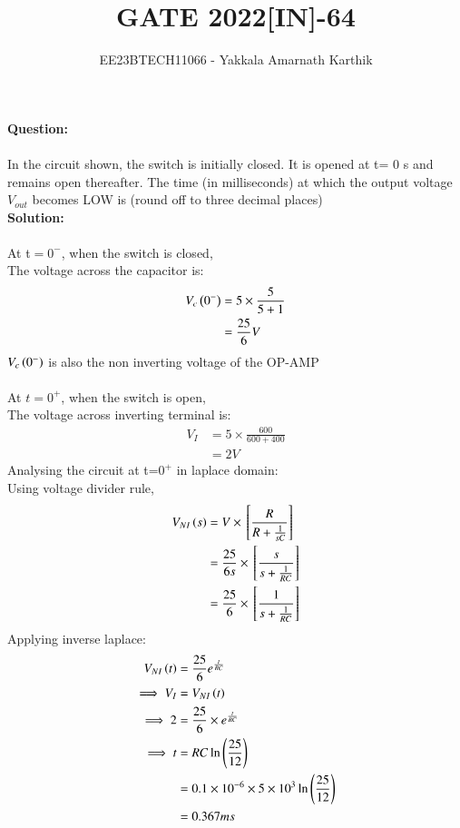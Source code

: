 \documentclass[journal,12pt,twocolumn]{IEEEtran}
\begin{document}


\title{GATE 2022[IN]-64}
\author{EE23BTECH11066 - Yakkala Amarnath Karthik}
\maketitle


\textbf{Question:}\\ \\
In the circuit shown, the switch is initially closed. It is opened at t= 0 s and
remains open thereafter. The time (in milliseconds) at which the output voltage
$V_{out}$ becomes LOW is  (round off to three decimal places)\\


\textbf{Solution:}\\ \\
At t$=0^-$, when the switch is closed,\\
The voltage across the capacitor is:
\begin{align}
V_c\left(0^-\right)&=5\times\frac{5}{5+1}\\
&=\frac{25}{6}V
\end{align}
$V_c\left(0^-\right)$ is also the non inverting voltage of the OP-AMP\\ \\
At $t=0^+$, when the switch is open,\\
The voltage across inverting terminal is:
\begin{align}
V_I&=5\times\frac{600}{600+400}\\
&=2V
\end{align}
Analysing the circuit at t=$0^+$ in laplace domain:\\ 

Using voltage divider rule,
\begin{align}
V_{NI}\left(s\right)&=V\times{}\left[\frac{R}{R+\frac{1}{sC}}\right]\\
    &=\frac{25}{6s}\times{}\left[\frac{s}{s+\frac{1}{RC}}\right]\\
    &=\frac{25}{6}\times{}\left[\frac{1}{s+\frac{1}{RC}}\right]
\end{align}
Applying inverse laplace:
\begin{align}
    V_{NI}\left(t\right)&=\frac{25}{6} e^{\frac{t}{RC}}\\
   \implies V_{I}&=V_{NI}\left(t\right)\\
    \implies  2&=\frac{25}{6}\times e^{\frac{t}{RC}}\\
  \implies  t&=RC\ln\left(\frac{25}{12}\right)\\
    &=0.1\times10^{-6}\times5\times10^{3}\ln{\ensuremath{\left(\frac{25}{12}\right)}}\\
    &=0.367ms
\end{align}
\end{document}
